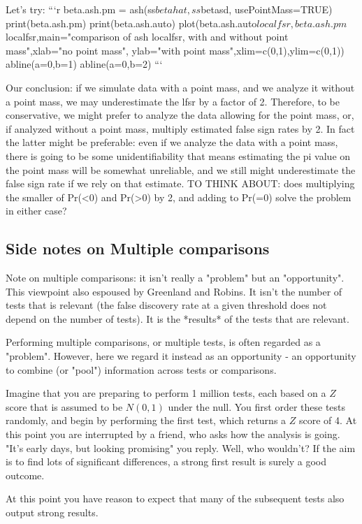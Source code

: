 \documentclass[11pt]{article}
\begin{document}
Let's try: 
```{r}
beta.ash.pm = ash(ss$betahat, ss$betasd, usePointMass=TRUE)
print(beta.ash.pm)
print(beta.ash.auto)
plot(beta.ash.auto$localfsr,beta.ash.pm$localfsr,main="comparison of ash localfsr, with and without point mass",xlab="no point mass", ylab="with point mass",xlim=c(0,1),ylim=c(0,1))
abline(a=0,b=1)
abline(a=0,b=2)
```

Our conclusion: if we simulate data with a point mass,
and we analyze it without a point mass, we may underestimate
the lfsr by a factor of 2. Therefore, to be conservative, we might prefer to analyze the data allowing for the point mass, or, if analyzed without a point mass, multiply estimated false sign rates by 2. In fact the latter might be preferable: even if we analyze the data with a point mass, there is going to be some unidentifiability
that means estimating the pi value on the point mass will be somewhat unreliable, and we still might underestimate the false sign rate if we rely on that estimate.  
TO THINK ABOUT: does multiplying the smaller of Pr(<0) and Pr(>0) by 2, and adding to Pr(=0) solve the problem in either case?


\subsection{Side notes on Multiple comparisons}

Note on multiple comparisons: it isn't really a "problem" but an "opportunity". This viewpoint also espoused by Greenland and Robins. It isn't the number of tests that is relevant (the false
discovery rate at a given threshold does not depend on the number of tests). It is the *results* of the tests that are relevant.

Performing multiple comparisons, or multiple tests, is often
regarded as a "problem". However, here we regard it instead as an opportunity - an opportunity to combine (or "pool") information across tests or comparisons.

Imagine that you are preparing to perform 1 million tests,
each based on a $Z$ score that is assumed to be $N(0,1)$ under the null.
You first order these tests randomly, and begin by 
performing the first test, which returns a $Z$ score of 4.
At this point you are interrupted by a friend, who asks how the analysis is going. "It's early days, but looking promising" you reply. Well, who wouldn't? If the aim is to find lots of significant differences, a strong first result is surely a good outcome. 

At this point you have reason to expect that many of the
subsequent tests also output strong results.
\end{document}
